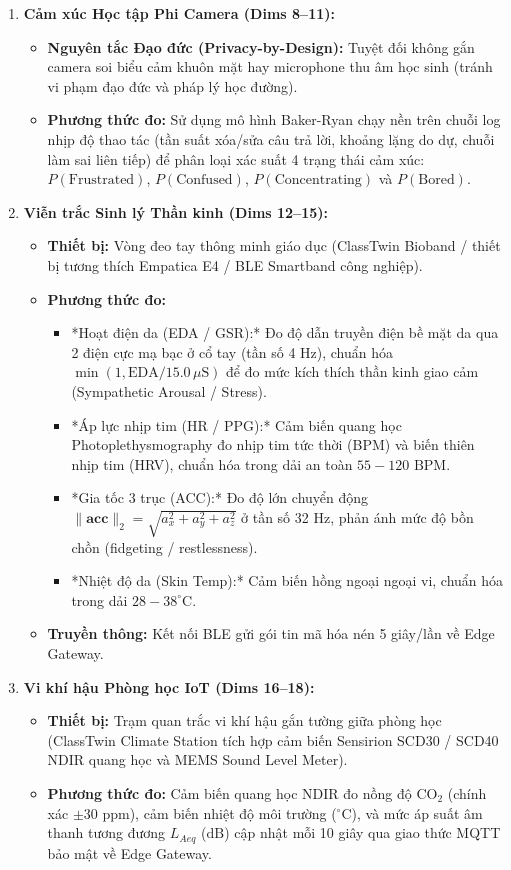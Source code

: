 \begin{enumerate}[label=\textbf{Nhóm \arabic*.}]
  \item \textbf{Cảm xúc Học tập Phi Camera (Dims 8--11):}
  \begin{itemize}
    \item \textbf{Nguyên tắc Đạo đức (Privacy-by-Design):} Tuyệt đối không gắn camera soi biểu cảm khuôn mặt hay microphone thu âm học sinh (tránh vi phạm đạo đức và pháp lý học đường).
    \item \textbf{Phương thức đo:} Sử dụng mô hình Baker-Ryan chạy nền trên chuỗi log nhịp độ thao tác (tần suất xóa/sửa câu trả lời, khoảng lặng do dự, chuỗi làm sai liên tiếp) để phân loại xác suất 4 trạng thái cảm xúc: $P(\text{Frustrated})$, $P(\text{Confused})$, $P(\text{Concentrating})$ và $P(\text{Bored})$.
  \end{itemize}

  \item \textbf{Viễn trắc Sinh lý Thần kinh (Dims 12--15):}
  \begin{itemize}
    \item \textbf{Thiết bị:} Vòng đeo tay thông minh giáo dục (ClassTwin Bioband / thiết bị tương thích Empatica E4 / BLE Smartband công nghiệp).
    \item \textbf{Phương thức đo:}
    \begin{itemize}
      \item *Hoạt điện da (EDA / GSR):* Đo độ dẫn truyền điện bề mặt da qua 2 điện cực mạ bạc ở cổ tay (tần số 4 Hz), chuẩn hóa $\min(1, \text{EDA} / 15.0\,\mu\text{S})$ để đo mức kích thích thần kinh giao cảm (Sympathetic Arousal / Stress).
      \item *Áp lực nhịp tim (HR / PPG):* Cảm biến quang học Photoplethysmography đo nhịp tim tức thời (BPM) và biến thiên nhịp tim (HRV), chuẩn hóa trong dải an toàn $55 - 120\text{ BPM}$.
      \item *Gia tốc 3 trục (ACC):* Đo độ lớn chuyển động $\|\mathbf{acc}\|_2 = \sqrt{a_x^2 + a_y^2 + a_z^2}$ ở tần số 32 Hz, phản ánh mức độ bồn chồn (fidgeting / restlessness).
      \item *Nhiệt độ da (Skin Temp):* Cảm biến hồng ngoại ngoại vi, chuẩn hóa trong dải $28 - 38^\circ\text{C}$.
    \end{itemize}
    \item \textbf{Truyền thông:} Kết nối BLE gửi gói tin mã hóa nén 5 giây/lần về Edge Gateway.
  \end{itemize}

  \item \textbf{Vi khí hậu Phòng học IoT (Dims 16--18):}
  \begin{itemize}
    \item \textbf{Thiết bị:} Trạm quan trắc vi khí hậu gắn tường giữa phòng học (ClassTwin Climate Station tích hợp cảm biến Sensirion SCD30 / SCD40 NDIR quang học và MEMS Sound Level Meter).
    \item \textbf{Phương thức đo:} Cảm biến quang học NDIR đo nồng độ $\text{CO}_2$ (chính xác $\pm 30\text{ ppm}$), cảm biến nhiệt độ môi trường ($^\circ\text{C}$), và mức áp suất âm thanh tương đương $L_{Aeq}$ ($\text{dB}$) cập nhật mỗi 10 giây qua giao thức MQTT bảo mật về Edge Gateway.
  \end{itemize}


\end{enumerate}
